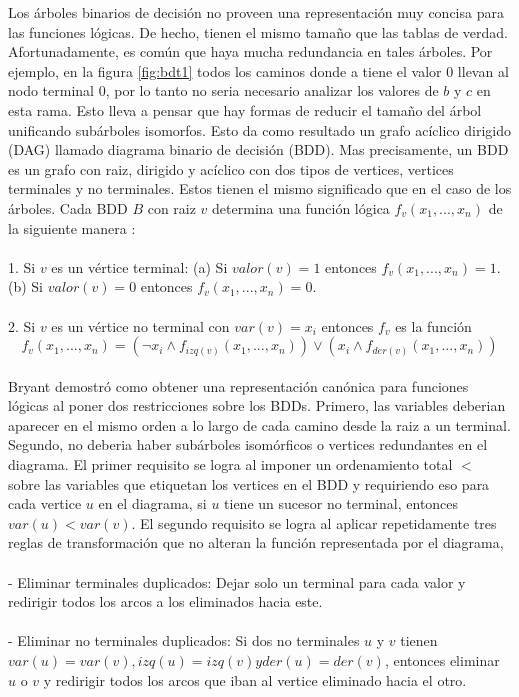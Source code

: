 Los árboles binarios de decisión no proveen una representación muy concisa para las funciones lógicas. De hecho, tienen el mismo tamaño que las tablas de verdad. Afortunadamente, es común que haya mucha redundancia en tales árboles. Por ejemplo, en la figura \ref{fig:bdt1} todos los caminos donde a tiene el valor 0 llevan al nodo terminal 0, por lo tanto no seria necesario analizar los valores de $b$ y $c$ en esta rama. Esto lleva a pensar que hay formas de reducir el tamaño del árbol unificando subárboles isomorfos. Esto da como resultado un grafo acíclico dirigido (DAG) llamado diagrama binario de decisión (BDD). Mas precisamente, un BDD es un grafo con raiz, dirigido y acíclico con dos tipos de vertices, vertices terminales y no terminales. Estos tienen el mismo significado que en el caso de los árboles. Cada BDD $B$ con raiz $v$ determina una función lógica $f_{v}(x_{1},...,x_{n})$ de la siguiente manera \cite{Clarke:1}:\\
\\
1. Si $v$ es un vértice terminal:
  (a) Si $valor(v) = 1$ entonces $f_{v}(x_{1},...,x_{n}) = 1$.
  (b) Si $valor(v) = 0$ entonces $f_{v}(x_{1},...,x_{n}) = 0$.\\
\\
2. Si $v$ es un vértice no terminal con $var(v) = x_{i}$ entonces $f_{v}$ es la función 
\[f_{v}(x_{1},...,x_{n}) = (\neg x_{i} \land f_{izq(v)}(x_{1},...,x_{n})) \lor (x_{i} \land f_{der(v)}(x_{1},...,x_{n}))\]\\
Bryant \cite{Bryant:8} demostró como obtener una representación canónica para funciones lógicas al poner dos restricciones sobre los BDDs. Primero, las variables deberian aparecer en el mismo orden a lo largo de cada camino desde la raiz a un terminal. Segundo, no deberia haber subárboles isomórficos o vertices redundantes en el diagrama. El primer requisito se logra al imponer un ordenamiento total $<$ sobre las variables que etiquetan los vertices en el BDD y requiriendo eso para cada vertice $u$ en el diagrama, si $u$ tiene un sucesor no terminal, entonces $var(u) < var(v)$. El segundo requisito se logra al aplicar repetidamente tres reglas de transformación que no alteran la función representada por el diagrama, \\
\\
- Eliminar terminales duplicados: Dejar solo un terminal para cada valor y redirigir todos los arcos a los eliminados hacia este.\\
\\
- Eliminar no terminales duplicados: Si dos no terminales $u$ y $v$ tienen $var(u) = var(v), izq(u) = izq(v) y der(u) = der(v)$, entonces eliminar $u$ o $v$ y redirigir todos los arcos que iban al vertice eliminado hacia el otro.\\

